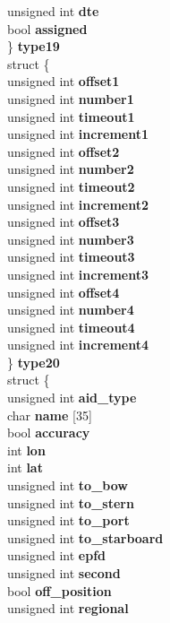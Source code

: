 \begin{DoxyCompactItemize}
{\begin{tabbing}
\>\>unsigned int {\bfseries dte}\\
\>\>bool {\bfseries assigned}\\
\>\} {\bfseries type19}\\
\>struct \{\\
\>\>unsigned int {\bfseries offset1}\\
\>\>unsigned int {\bfseries number1}\\
\>\>unsigned int {\bfseries timeout1}\\
\>\>unsigned int {\bfseries increment1}\\
\>\>unsigned int {\bfseries offset2}\\
\>\>unsigned int {\bfseries number2}\\
\>\>unsigned int {\bfseries timeout2}\\
\>\>unsigned int {\bfseries increment2}\\
\>\>unsigned int {\bfseries offset3}\\
\>\>unsigned int {\bfseries number3}\\
\>\>unsigned int {\bfseries timeout3}\\
\>\>unsigned int {\bfseries increment3}\\
\>\>unsigned int {\bfseries offset4}\\
\>\>unsigned int {\bfseries number4}\\
\>\>unsigned int {\bfseries timeout4}\\
\>\>unsigned int {\bfseries increment4}\\
\>\} {\bfseries type20}\\
\>struct \{\\
\>\>unsigned int {\bfseries aid\_type}\\
\>\>char {\bfseries name} \mbox{[}35\mbox{]}\\
\>\>bool {\bfseries accuracy}\\
\>\>int {\bfseries lon}\\
\>\>int {\bfseries lat}\\
\>\>unsigned int {\bfseries to\_bow}\\
\>\>unsigned int {\bfseries to\_stern}\\
\>\>unsigned int {\bfseries to\_port}\\
\>\>unsigned int {\bfseries to\_starboard}\\
\>\>unsigned int {\bfseries epfd}\\
\>\>unsigned int {\bfseries second}\\
\>\>bool {\bfseries off\_position}\\
\>\>unsigned int {\bfseries regional}\\

\end{tabbing}}
\end{DoxyCompactItemize}
